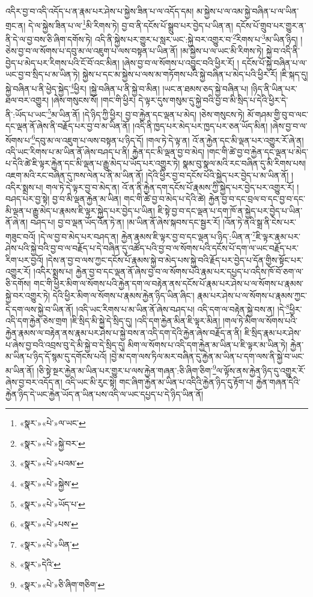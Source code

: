 འདིར་བྱ་བ་འདི་འདོད་པ་ན་རྣམ་པར་ཤེས་པ་སྐྱེས་ཟིན་པ་ལ་འདོད་དམ། མ་སྐྱེས་པ་ལ་འམ་སྐྱེ་བཞིན་པ་ལ་ཡིན་གྲང་ན། དེ་ལ་སྐྱེས་ཟིན་པ་ལ་\footnote{«སྣར་»«པེ་»ལ་ཡང་}མི་རིགས་ཏེ། བྱ་བ་ནི་དངོས་པོ་སྒྲུབ་པར་བྱེད་པ་ཡིན་ན། དངོས་པོ་གྲུབ་པར་གྱུར་ན་ནི་དེ་ལ་བྱ་བས་ཅི་ཞིག་དགོས་ཏེ། འདི་ནི་སྐྱེས་པར་གྱུར་པ་སླར་ཡང་:སྐྱེ་བར་འགྱུར་བ་\footnote{«སྣར་»«པེ་»སྐྱེ་བར་}རིགས་པ་\footnote{«སྣར་»«པེ་»པའམ་}མ་ཡིན་ཉིད། །ཅེས་བྱ་བ་ལ་སོགས་པ་དབུ་མ་ལ་འཇུག་པ་ལས་བསྟན་པ་ཡིན་ནོ། །མ་སྐྱེས་པ་ལ་ཡང་མི་རིགས་ཏེ། སྐྱེ་བ་འདི་ནི་བྱེད་པ་མེད་པར་རིགས་པའི་ངོ་བོ་འང་མིན། །ཞེས་བྱ་བ་ལ་སོགས་པ་འབྱུང་བའི་ཕྱིར་རོ། །
དངོས་པོ་སྐྱེ་བཞིན་པ་ལ་ཡང་བྱ་བ་སྲིད་པ་མ་ཡིན་ཏེ། སྐྱེས་པ་དང་མ་སྐྱེས་པ་ལས་མ་གཏོགས་པའི་སྐྱེ་བཞིན་པ་མེད་པའི་ཕྱིར་རོ། །ཇི་སྐད་དུ། སྐྱེ་བཞིན་པ་ནི་ཕྱེད་སྐྱེད་\footnote{«སྣར་»«པེ་»སྐྱེས་}ཕྱིར། །སྐྱེ་བཞིན་པ་ནི་སྐྱེ་བ་མིན། །ཡང་ན་ཐམས་ཅད་སྐྱེ་བཞིན་པ། །ཉིད་ནི་ཡིན་པར་ཐལ་བར་འགྱུར། །ཞེས་གསུངས་སོ། །གང་གི་ཕྱིར། དེ་ལྟར་དུས་གསུམ་དུ་སྐྱེ་བའི་བྱ་བ་མི་སྲིད་པ་དེའི་ཕྱིར་དེ་ནི་:ཡོད་པ་ཡང་\footnote{«སྣར་»«པེ་»ཡོད་པ་}མ་ཡིན་ནོ། །དེ་ཉིད་ཀྱི་ཕྱིར། བྱ་བ་རྐྱེན་དང་ལྡན་པ་མེད། །ཅེས་གསུངས་ཏེ། མོ་གཤམ་གྱི་བུ་བ་ལང་དང་ལྡན་ནོ་ཞེས་ནི་བརྗོད་པར་བྱ་བ་མ་ཡིན་ནོ། །འདི་ནི་ཁྱད་པར་མེད་པར་ཁྱད་པར་ཅན་ཡོད་མིན། །ཞེས་བྱ་བ་ལ་སོགས་པ་\footnote{«སྣར་»«པེ་»པས་}དབུ་མ་ལ་འཇུག་པ་ལས་བསྟན་པ་ཉིད་དོ། །གལ་ཏེ་དེ་ལྟ་ན། འོ་ན་རྐྱེན་དང་མི་ལྡན་པར་འགྱུར་རོ་ཞེ་ན། འདི་ཡང་རིགས་པ་མ་ཡིན་ནོ་ཞེས་བཤད་པ་ནི། རྐྱེན་དང་མི་ལྡན་བྱ་བ་མེད། །གང་གི་ཚེ་བྱ་བ་རྐྱེན་དང་ལྡན་པ་མེད་པ་དེའི་ཚེ་ཇི་ལྟར་རྐྱེན་དང་མི་ལྡན་པ་རྒྱུ་མེད་པ་ཡོད་པར་འགྱུར་ཏེ། སྣམ་བུ་སྣལ་མའི་རང་བཞིན་དུ་མི་རིགས་པས། འཇག་མའི་རང་བཞིན་དུ་ཁས་ལེན་པ་ནི་མ་ཡིན་ནོ། །དེའི་ཕྱིར་བྱ་བ་དངོས་པོའི་སྐྱེད་པར་བྱེད་པ་མ་ཡིན་ནོ། །འདིར་སྨྲས་པ། གལ་ཏེ་དེ་ལྟར་བྱ་བ་མེད་ན། འོ་ན་ནི་རྐྱེན་དག་དངོས་པོ་རྣམས་ཀྱི་སྐྱེད་པར་བྱེད་པར་འགྱུར་རོ། །བཤད་པར་བྱ་སྟེ། བྱ་བ་མི་ལྡན་རྐྱེན་མ་ཡིན། གང་གི་ཚེ་བྱ་བ་མེད་པ་དེའི་ཚེ། རྐྱེན་བྱ་བ་དང་བྲལ་བ་དང་བྱ་བ་དང་མི་ལྡན་པ་རྒྱུ་མེད་པ་རྣམས་ཇི་ལྟར་སྐྱེད་པར་བྱེད་པ་ཡིན། ཇི་སྟེ་བྱ་བ་དང་ལྡན་པ་དག་ཁོ་ན་སྐྱེད་པར་བྱེད་པ་ཡིན་ནོ་ཞེ་ན། བཤད་པ། བྱ་བ་ལྡན་ཡོད་འོན་ཏེ་ན། །མ་ཡིན་ནོ་ཞེས་སྐབས་དང་སྦྱར་རོ། །འོན་ཏེ་ནའི་སྒྲ་ནི་ངེས་པར་གཟུང་བའོ། །དེ་ལ་བྱ་བ་མེད་པར་བཤད་ན། རྐྱེན་རྣམས་ཇི་ལྟར་བྱ་བ་དང་ལྡན་པ་ཉིད་:ཡིན་ན་\footnote{«སྣར་»«པེ་»ཡིན་}ཇི་ལྟར་རྣམ་པར་ཤེས་པའི་སྐྱེ་བའི་བྱ་བ་ལ་བརྗོད་པ་དེ་བཞིན་དུ་འཚོད་པའི་བྱ་བ་ལ་སོགས་པའི་དངོས་པོ་དག་ལ་ཡང་བརྗོད་པར་རིག་པར་བྱའོ། །དེས་ན་བྱ་བ་ལས་ཀྱང་དངོས་པོ་རྣམས་སྐྱེ་བ་མེད་པས་སྐྱེ་བའི་རྗོད་པར་བྱེད་པ་དོན་གྱིས་སྟོང་པར་འགྱུར་རོ། །འདིར་སྨྲས་པ། རྐྱེན་བྱ་བ་དང་ལྡན་ནོ་ཞེས་བྱ་བ་ལ་སོགས་པའི་རྣམ་པར་དཔྱད་པ་འདིས་ཁོ་བོ་ཅག་ལ་ཅི་དགོས། གང་གི་ཕྱིར་མིག་ལ་སོགས་པའི་རྐྱེན་དག་ལ་བརྟེན་ནས་དངོས་པོ་རྣམ་པར་ཤེས་པ་ལ་སོགས་པ་རྣམས་སྐྱེ་བར་འགྱུར་ཏེ། དེའི་ཕྱིར་མིག་ལ་སོགས་པ་རྣམས་རྐྱེན་ཉིད་ཡིན་ཞིང་། རྣམ་པར་ཤེས་པ་ལ་སོགས་པ་རྣམས་ཀྱང་དེ་དག་ལས་སྐྱེ་བ་ཡིན་ནོ། །འདི་ཡང་རིགས་པ་མ་ཡིན་ནོ་ཞེས་བཤད་པ། འདི་དག་ལ་བརྟེན་སྐྱེ་བས་ན། །དེ་\footnote{«སྣར་»དེའི་}ཕྱིར་འདི་དག་རྐྱེན་ཅེས་གྲག །ཇི་སྲིད་མི་སྐྱེ་དེ་སྲིད་དུ། །འདི་དག་རྐྱེན་མིན་ཇི་ལྟར་མིན། །གལ་ཏེ་མིག་ལ་སོགས་པའི་རྐྱེན་རྣམས་ལ་བརྟེན་ནས་རྣམ་པར་ཤེས་པ་སྐྱེ་བས་ན་འདི་དག་དེའི་རྐྱེན་ཞེས་བརྗོད་ན་ནི། ཇི་སྲིད་རྣམ་པར་ཤེས་པ་ཞེས་བྱ་བའི་འབྲས་བུ་དེ་མི་སྐྱེ་བ་དེ་སྲིད་དུ། མིག་ལ་སོགས་པ་འདི་དག་རྐྱེན་མ་ཡིན་པ་ཇི་ལྟར་མ་ཡིན་ཏེ། རྐྱེན་མ་ཡིན་པ་ཉིད་དོ་སྙམ་དུ་དགོངས་པའོ། །བྱེ་མ་དག་ལས་ཏིལ་མར་བཞིན་དུ་རྐྱེན་མ་ཡིན་པ་དག་ལས་ནི་སྐྱེ་བ་ཡང་མ་ཡིན་ནོ། །ཅི་སྟེ་སྔར་རྐྱེན་མ་ཡིན་པར་གྱུར་པ་ལས་རྐྱེན་གཞན་:ཅི་ཞིག་ཅིག་\footnote{«སྣར་»«པེ་»ཅི་ཞིག་གཅིག་}ལ་ལྟོས་ནས་རྐྱེན་ཉིད་དུ་འགྱུར་རོ་ཞེས་བྱ་བར་འདོད་ན། འདི་ཡང་མི་རུང་སྟེ། གང་ཞིག་རྐྱེན་མ་ཡིན་པ་འདིའི་རྐྱེན་ཉིད་དུ་རྟོག་པ། རྐྱེན་གཞན་དེའི་རྐྱེན་ཉིད་དེ་ཡང་རྐྱེན་ཡོད་ན་ཡིན་པས་འདི་ལ་ཡང་དཔྱད་པ་དེ་ཉིད་ཡིན་ནོ། 
